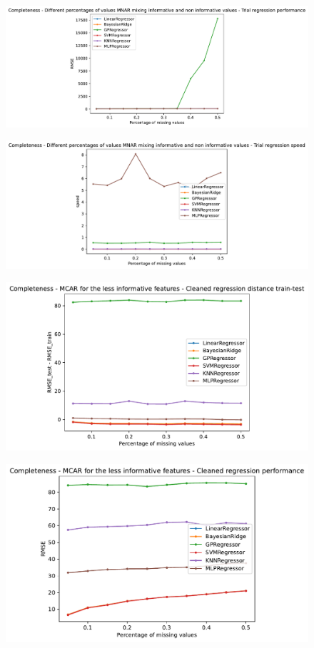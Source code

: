 \documentclass{Configuration_Files/PoliMi3i_thesis}
\begin{document}
\begin{figure}[H]
    \centering
    \includegraphics[scale=0.6]{Images/completeness/8.pdf}
\end{figure}
\begin{figure}[H]
    \centering
    \includegraphics[scale=0.6]{Images/completeness/9.pdf}
\end{figure}
\begin{figure}[H]
    \centering
    \includegraphics[scale=0.6]{Images/completeness/10.pdf}
\end{figure}
\begin{figure}[H]
    \centering
    \includegraphics[scale=0.6]{Images/completeness/11.pdf}
\end{figure}
\end{document}
